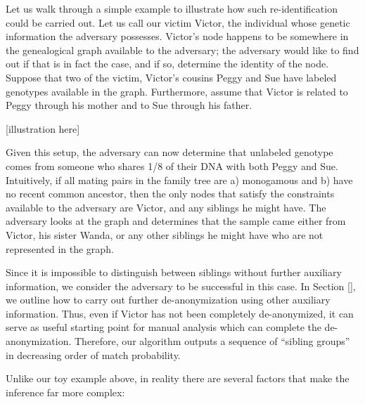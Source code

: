 \documentclass{article}
\begin{document}
Let us walk through a simple example to illustrate how such re-identification could be carried out. Let us call our victim Victor, the individual whose genetic information the adversary possesses.  Victor's node happens to be somewhere in the genealogical graph available to the adversary; the adversary would like to find out if that is in fact the case, and if so, determine the identity of the node. Suppose that two of the victim, Victor's cousins Peggy and Sue have labeled genotypes available in the graph. Furthermore, assume that Victor is related to Peggy through his mother and to Sue through his father.  

[illustration here]

Given this setup, the adversary can now determine that unlabeled genotype comes from someone who shares 1/8 of their DNA with both Peggy and Sue. Intuitively, if all mating pairs in the family tree are a) monogamous and b) have no recent common ancestor, then the only nodes that satisfy the constraints available to the adversary are Victor, and any siblings he might have. The adversary looks at the graph and determines that the sample came either from Victor, his sister Wanda, or any other siblings he might have who are not represented in the graph.

Since it is impossible to distinguish between siblings without further auxiliary information, we consider the adversary to be successful in this case. In Section \ref{}, we outline how to carry out further de-anonymization using other auxiliary information. Thus, even if Victor has not been completely de-anonymized, it can serve as useful starting point for manual analysis which can complete the de-anonymization. Therefore, our algorithm outputs a sequence of ``sibling groups'' in decreasing order of match probability.

Unlike our toy example above, in reality there are several factors that make the inference far more complex: 
\end{document}

